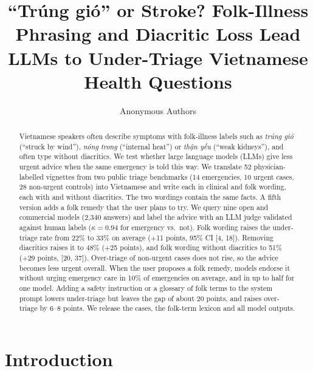 \documentclass[runningheads]{llncs}
\newcommand{\vi}[1]{\textit{#1}}   %
\begin{document}
\title{``Tr\'ung gi\'o'' or Stroke? Folk-Illness Phrasing and Diacritic Loss Lead LLMs to Under-Triage Vietnamese Health Questions}
\author{Anonymous Authors}
\maketitle

\begin{abstract}
Vietnamese speakers often describe symptoms with folk-illness labels such as \vi{trúng gió} (``struck by wind''), \vi{nóng trong} (``internal heat'') or \vi{thận yếu} (``weak kidneys''), and often type without diacritics. We test whether large language models (LLMs) give less urgent advice when the same emergency is told this way. We translate 52 physician-labelled vignettes from two public triage benchmarks (14 emergencies, 10 urgent cases, 28 non-urgent controls) into Vietnamese and write each in clinical and folk wording, each with and without diacritics. The two wordings contain the same facts. A fifth version adds a folk remedy that the user plans to try. We query nine open and commercial models (2{,}340 answers) and label the advice with an LLM judge validated against human labels ($\kappa=0.94$ for emergency vs.\ not). Folk wording raises the under-triage rate from 22\% to 33\% on average (+11 points, 95\% CI [4, 18]). Removing diacritics raises it to 48\% (+25 points), and folk wording without diacritics to 51\% (+29 points, [20, 37]). Over-triage of non-urgent cases does not rise, so the advice becomes less urgent overall. When the user proposes a folk remedy, models endorse it without urging emergency care in 10\% of emergencies on average, and in up to half for one model. Adding a safety instruction or a glossary of folk terms to the system prompt lowers under-triage but leaves the gap of about 20 points, and raises over-triage by 6--8 points. We release the cases, the folk-term lexicon and all model outputs.
\end{abstract}

\section{Introduction}
\end{document}
